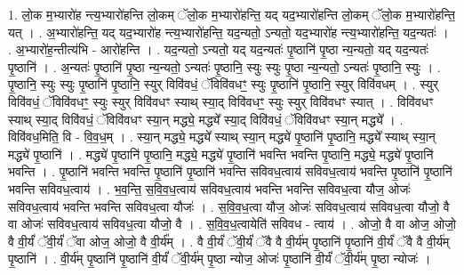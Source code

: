 \documentclass[17pt]{extarticle}
\begin{document}
1. लो॒क म॒भ्यारो॑ह न्त्य॒भ्यारो॑हन्ति लो॒कम् ॅलो॒क म॒भ्यारो॑हन्ति॒ यद् यद॒भ्यारो॑हन्ति लो॒कम् ॅलो॒क म॒भ्यारो॑हन्ति॒ यत् । . अ॒भ्यारो॑हन्ति॒ यद् यद॒भ्यारो॑ह न्त्य॒भ्यारो॑हन्ति॒ यद॒न्यतो॒ ऽन्यतो॒ यद॒भ्यारो॑ह न्त्य॒भ्यारो॑हन्ति॒ यद॒न्यतः॑ । . अ॒भ्यारो॑ह॒न्तीत्य॑भि - आरो॑हन्ति । . यद॒न्यतो॒ ऽन्यतो॒ यद् यद॒न्यतः॑ पृ॒ष्ठानि॑ पृ॒ष्ठा न्य॒न्यतो॒ यद् यद॒न्यतः॑ पृ॒ष्ठानि॑ । . अ॒न्यतः॑ पृ॒ष्ठानि॑ पृ॒ष्ठा न्य॒न्यतो॒ ऽन्यतः॑ पृ॒ष्ठानि॒ स्युः स्युः पृ॒ष्ठा न्य॒न्यतो॒ ऽन्यतः॑ पृ॒ष्ठानि॒ स्युः । . पृ॒ष्ठानि॒ स्युः स्युः पृ॒ष्ठानि॑ पृ॒ष्ठानि॒ स्युर् विवि॑वधं॒ ॅविवि॑वधꣳ॒॒ स्युः पृ॒ष्ठानि॑ पृ॒ष्ठानि॒ स्युर् विवि॑वधम् । . स्युर् विवि॑वधं॒ ॅविवि॑वधꣳ॒॒ स्युः स्युर् विवि॑वधꣳ स्याथ् स्या॒द् विवि॑वधꣳ॒॒ स्युः स्युर् विवि॑वधꣳ स्यात् । . विवि॑वधꣳ स्याथ् स्या॒द् विवि॑वधं॒ ॅविवि॑वधꣳ स्या॒न् मद्ध्ये॒ मद्ध्ये᳚ स्या॒द् विवि॑वधं॒ ॅविवि॑वधꣳ स्या॒न् मद्ध्ये᳚ । . विवि॑वध॒मिति॒ वि - वि॒व॒ध॒म् । . स्या॒न् मद्ध्ये॒ मद्ध्ये᳚ स्याथ् स्या॒न् मद्ध्ये॑ पृ॒ष्ठानि॑ पृ॒ष्ठानि॒ मद्ध्ये᳚ स्याथ् स्या॒न् मद्ध्ये॑ पृ॒ष्ठानि॑ । . मद्ध्ये॑ पृ॒ष्ठानि॑ पृ॒ष्ठानि॒ मद्ध्ये॒ मद्ध्ये॑ पृ॒ष्ठानि॑ भवन्ति भवन्ति पृ॒ष्ठानि॒ मद्ध्ये॒ मद्ध्ये॑ पृ॒ष्ठानि॑ भवन्ति । . पृ॒ष्ठानि॑ भवन्ति भवन्ति पृ॒ष्ठानि॑ पृ॒ष्ठानि॑ भवन्ति सविवध॒त्वाय॑ सविवध॒त्वाय॑ भवन्ति पृ॒ष्ठानि॑ पृ॒ष्ठानि॑ भवन्ति सविवध॒त्वाय॑ । . भ॒व॒न्ति॒ स॒वि॒व॒ध॒त्वाय॑ सविवध॒त्वाय॑ भवन्ति भवन्ति सविवध॒त्वा यौज॒ ओजः॑ सविवध॒त्वाय॑ भवन्ति भवन्ति सविवध॒त्वा यौजः॑ । . स॒वि॒व॒ध॒त्वा यौज॒ ओजः॑ सविवध॒त्वाय॑ सविवध॒त्वा यौजो॒ वै वा ओजः॑ सविवध॒त्वाय॑ सविवध॒त्वा यौजो॒ वै । . स॒वि॒व॒ध॒त्वायेति॑ सविवध - त्वाय॑ । . ओजो॒ वै वा ओज॒ ओजो॒ वै वी॒र्यं॑ ॅवी॒र्यं॑ ॅवा ओज॒ ओजो॒ वै वी॒र्य᳚म् । . वै वी॒र्यं॑ ॅवी॒र्यं॑ ॅवै वै वी॒र्य॑म् पृ॒ष्ठानि॑ पृ॒ष्ठानि॑ वी॒र्यं॑ ॅवै वै वी॒र्य॑म् पृ॒ष्ठानि॑ । . वी॒र्य॑म् पृ॒ष्ठानि॑ पृ॒ष्ठानि॑ वी॒र्यं॑ ॅवी॒र्य॑म् पृ॒ष्ठा न्योज॒ ओजः॑ पृ॒ष्ठानि॑ वी॒र्यं॑ ॅवी॒र्य॑म् पृ॒ष्ठा न्योजः॑ । \newline
\end{document}
